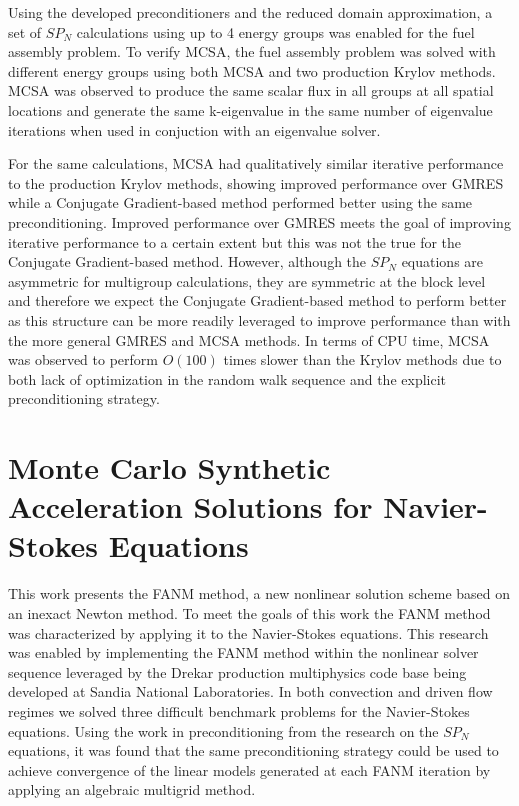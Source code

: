 Using the developed preconditioners and the reduced domain
approximation, a set of $SP_N$ calculations using up to 4 energy
groups was enabled for the fuel assembly problem. To verify MCSA, the
fuel assembly problem was solved with different energy groups using
both MCSA and two production Krylov methods. MCSA was observed to
produce the same scalar flux in all groups at all spatial locations
and generate the same k-eigenvalue in the same number of eigenvalue
iterations when used in conjuction with an eigenvalue solver.

For the same calculations, MCSA had qualitatively similar iterative
performance to the production Krylov methods, showing improved
performance over GMRES while a Conjugate Gradient-based method
performed better using the same preconditioning. Improved performance
over GMRES meets the goal of improving iterative performance to a
certain extent but this was not the true for the Conjugate
Gradient-based method. However, although the $SP_N$ equations are
asymmetric for multigroup calculations, they are symmetric at the
block level and therefore we expect the Conjugate Gradient-based
method to perform better as this structure can be more readily
leveraged to improve performance than with the more general GMRES and
MCSA methods. In terms of CPU time, MCSA was observed to perform
$O(100)$ times slower than the Krylov methods due to both lack of
optimization in the random walk sequence and the explicit
preconditioning strategy.

\section{Monte Carlo Synthetic Acceleration Solutions for Navier-Stokes Equations\ }
\label{sec:nonlinear_conclusions}

This work presents the FANM method, a new nonlinear solution scheme
based on an inexact Newton method. To meet the goals of this work the
FANM method was characterized by applying it to the Navier-Stokes
equations. This research was enabled by implementing the FANM method
within the nonlinear solver sequence leveraged by the Drekar production
multiphysics code base being developed at Sandia National
Laboratories. In both convection and driven flow regimes we solved
three difficult benchmark problems for the Navier-Stokes
equations. Using the work in preconditioning from the research on the
$SP_N$ equations, it was found that the same preconditioning strategy
could be used to achieve convergence of the linear models generated at
each FANM iteration by applying an algebraic multigrid method.

